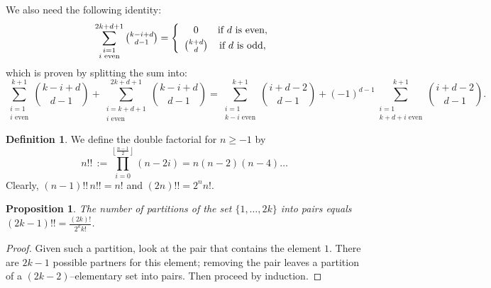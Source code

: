 \documentclass{amsart}
\newcommand{\coloneqq}{:=}
\theoremstyle{plain}
\newtheorem{proposition}[theorem]{Proposition}
\theoremstyle{definition}
\newtheorem{definition}[theorem]{Definition}
\theoremstyle{remark}
\begin{document}
We also need the following identity:
\begin{equation} \label{evensum}
\sum_{\substack{i=1\\i\text{ even}}}^{2k+d+1}\textstyle \binom{k-i+d}{d-1} = \left\{ 
 \begin{array}{*2{c}p{5cm}}0 &\text{if }d\text{ is even}, \vspace{1mm}\\
 \binom{k+d}{d} &\text{if }d\text{ is odd},
\end{array}\right.
\end{equation}
which is proven by splitting the sum into:
$$
\sum_{\substack{i=1\\i\text{ even}}}^{k+1} \textstyle\binom{k-i+d}{d-1} + \displaystyle\sum_{\substack{i=k+d+1\\i\text{ even}}}^{2k+d+1}\textstyle \binom{k-i+d}{d-1}
= \displaystyle\sum_{\substack{i=1\\k-i\text{ even}}}^{k+1}\!\! \textstyle\binom{i+d-2}{d-1} +(-1)^{d-1} \!\!\!\!
 \displaystyle\sum_{\substack{i=1\\k+d+i\text{ even}}}^{k+1} \!\!\!\! \textstyle\binom{i+d-2}{d-1} .
$$

\begin{definition}\label{doublefactorial}
We define the double factorial for $ n\geq -1$ by 
$$n!! \,\coloneqq \prod_{i=0}^{\left\lfloor\!\frac{n-1}{2}\!\right\rfloor }(n-2i)=n(n-2)(n-4)\ldots $$
Clearly, $(n-1)!!\,n!! = n!$ and $(2n)!! = 2^n n!$.
\end{definition}
\begin{proposition}
The number of partitions of the set $\{1,\ldots,2k\}$ into pairs equals $(2k-1)!! = \frac{(2k)!}{2^kk!}$.
\end{proposition}
\begin{proof}
Given such a partition, look at the pair that contains the element $1$. There are $2k-1$ possible partners for this element; removing the pair leaves a partition of a $(2k-2)$--elementary set into pairs. Then proceed by induction.
\end{proof}
\end{document}
